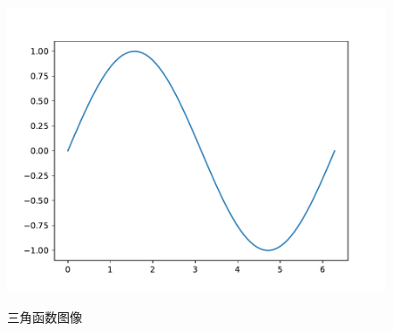 \documentclass[fontset=windows, 12pt]{article}
\begin{document}
  \begin{figure}[!htb]
     \centering
      \includegraphics[scale=0.5]{Tran.pdf}
      \label{a}
      \caption{三角函数图像}
  \end{figure}
\end{document}
